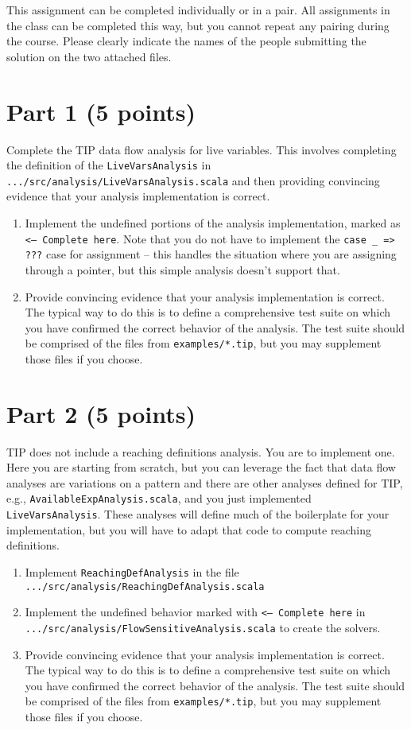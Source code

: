 \documentclass[12pt,letterpaper]{article}
\begin{document}
This assignment can be completed individually or in a pair.  All assignments in the class can be completed this way, but you cannot repeat any pairing during the course.  Please clearly indicate the names of the people submitting the solution on the two attached files.

\section*{Part 1 (5 points)}
Complete the TIP data flow analysis for live variables.  This involves
completing the definition of the \texttt{LiveVarsAnalysis} in \texttt{.../src/analysis/LiveVarsAnalysis.scala} and then providing convincing evidence
that your analysis implementation is correct.
\begin{enumerate}
\item Implement the undefined portions of the analysis implementation, marked as \texttt{<--- Complete here}.  Note that you do not have to 
implement the \verb|case _ => ???| case for assignment -- this handles the situation where you are assigning through a pointer, but this simple analysis doesn't support that.
\item Provide convincing evidence that your analysis implementation is correct.  The typical way to do this is to define a comprehensive test suite on which you have confirmed the correct behavior of the analysis.  The test suite should be comprised of the files from \texttt{examples/*.tip}, but you may supplement those files if you choose.
\end{enumerate}

\section*{Part 2 (5 points)}
TIP does not include a reaching definitions analysis.  You are to implement one.
Here you are starting from scratch, but you can leverage the fact that data flow analyses are variations on a pattern and there are other analyses defined for TIP, e.g., \texttt{AvailableExpAnalysis.scala}, and you just implemented \texttt{LiveVarsAnalysis}.  These analyses will define much of the boilerplate for your implementation, but you will have to adapt that code to compute reaching definitions.
\begin{enumerate}
\item Implement \texttt{ReachingDefAnalysis} in the file \texttt{.../src/analysis/ReachingDefAnalysis.scala}
\item Implement the undefined behavior marked with \texttt{<--- Complete here} in\\ 
\texttt{.../src/analysis/FlowSensitiveAnalysis.scala} to create the solvers.
\item Provide convincing evidence that your analysis implementation is correct.  The typical way to do this is to define a comprehensive test suite on which you have confirmed the correct behavior of the analysis.  The test suite should be comprised of the files from \texttt{examples/*.tip}, but you may supplement those files if you choose.
\end{enumerate}
\end{document}
